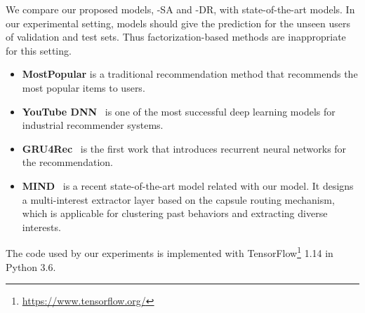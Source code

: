  We compare our proposed models, \model-SA and \model-DR, with state-of-the-art models. In our experimental setting, models should give the prediction for the unseen users of validation and test sets. Thus factorization-based methods are inappropriate for this setting.
\begin{itemize}
    \item \textbf{MostPopular} is a traditional recommendation method that recommends the most popular items to users. 
    \item \textbf{YouTube DNN}~\cite{covington2016deep} is one of the most successful deep learning models for industrial recommender systems.
    \item \textbf{GRU4Rec}~\cite{hidasi2015session} is the first work that introduces recurrent neural networks for the recommendation. 
    \item \textbf{MIND}~\cite{li2019multi} is a recent state-of-the-art model related with our model. It designs a multi-interest extractor layer based on the capsule routing mechanism, which is applicable for clustering past behaviors and extracting diverse interests.
\end{itemize}

The code used by our experiments is implemented with TensorFlow\footnote{\url{https://www.tensorflow.org/}} 1.14 in Python 3.6. %

